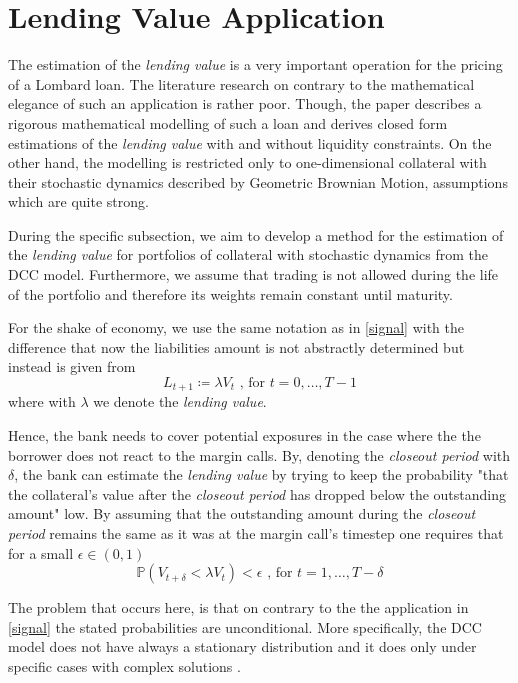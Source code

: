 \documentclass[a4paper, oneside]{discothesis}
\begin{document}
\section{Lending Value Application}\label{lendingValue}

The estimation of the \textit{lending value} is a very important operation for the pricing of a Lombard loan. The literature research on contrary to the mathematical elegance of such an application is rather poor. Though, the paper \cite{juri} describes a rigorous mathematical modelling of such a loan and derives closed form estimations of the \textit{lending value} with and without liquidity constraints. On the other hand, the modelling is restricted only to one-dimensional collateral with their stochastic dynamics described by Geometric Brownian Motion, assumptions which are quite strong. 

During the specific subsection, we aim to develop a method for the estimation of the \textit{lending value} for portfolios of collateral with stochastic dynamics from the DCC model. Furthermore, we assume that trading is not allowed during the life of the portfolio and therefore its weights remain constant until maturity.

For the shake of economy, we use the same notation as in \ref{signal} with the difference that now the liabilities amount is not abstractly determined but instead is given from
\begin{equation}
    L_{t+1} \coloneqq \lambda V_t \text{ , for } t=0, \dots, T-1
\end{equation}
where with $\lambda$ we denote the \textit{lending value}.

Hence, the bank needs to cover potential exposures in the case where the the borrower does not react to the margin calls. By, denoting the \textit{closeout period} with $
\delta$, the bank can estimate the \textit{lending value} by trying to keep the probability "that the collateral's value after the \textit{closeout period} has dropped below the outstanding amount" low. By assuming that the outstanding amount during the \textit{closeout period} remains the same as it was at the margin call's timestep one requires that for a small $\epsilon\in(0,1)$
\begin{equation}
    \mathbb{P}(V_{t+\delta}<\lambda V_t)<\epsilon\text{ , for }t = 1, \dots, T-\delta
\end{equation}

The problem that occurs here, is that on contrary to the the application in \ref{signal} the stated probabilities are unconditional. More specifically, the DCC model does not have always a stationary distribution and it does only under specific cases with complex solutions \cite{dccStationarity}. 
\end{document}
